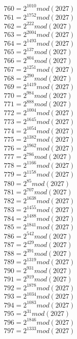 \documentclass[12pt, letterpaper]{article}
\begin{document}
\begin{itemize}
\begin{multicols}{3}
$760= 2^{1010} mod (2027)$\\
$761= 2^{1752} mod (2027)$\\
$762= 2^{222} mod (2027)$\\
$763= 2^{2004} mod (2027)$\\
$764= 2^{1493} mod (2027)$\\
$765= 2^{137} mod (2027)$\\
$766= 2^{804} mod (2027)$\\
$767= 2^{1251} mod (2027)$\\
$768= 2^{290} mod (2027)$\\
$769= 2^{1419} mod (2027)$\\
$770= 2^{984} mod (2027)$\\
$771= 2^{888} mod (2027)$\\
$772= 2^{1004} mod (2027)$\\
$773= 2^{1645} mod (2027)$\\
$774= 2^{1054} mod (2027)$\\
$775= 2^{1382} mod (2027)$\\
$776= 2^{1962} mod (2027)$\\
$777= 2^{786} mod (2027)$\\
$778= 2^{1166} mod (2027)$\\
$779= 2^{1158} mod (2027)$\\
$780= 2^{85} mod (2027)$\\
$781= 2^{707} mod (2027)$\\
$782= 2^{1638} mod (2027)$\\
$783= 2^{1455} mod (2027)$\\
$784= 2^{1488} mod (2027)$\\
$785= 2^{1841} mod (2027)$\\
$786= 2^{542} mod (2027)$\\
$787= 2^{429} mod (2027)$\\
$788= 2^{391} mod (2027)$\\
$789= 2^{1319} mod (2027)$\\
$790= 2^{931} mod (2027)$\\
$791= 2^{919} mod (2027)$\\
$792= 2^{1878} mod (2027)$\\
$793= 2^{1034} mod (2027)$\\
$794= 2^{1083} mod (2027)$\\
$795= 2^{31} mod (2027)$\\
$796= 2^{1846} mod (2027)$\\
$797= 2^{1333} mod (2027)$\\

\end{multicols}
\end{itemize}
\end{document}
